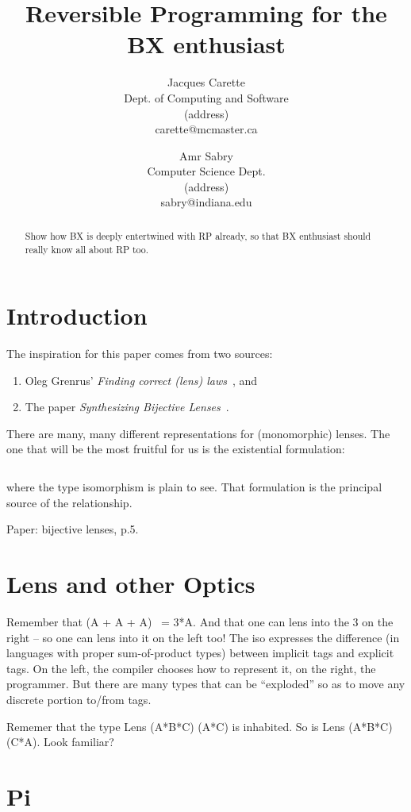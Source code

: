 \documentclass[a4paper]{article}
\title{Reversible Programming for the BX enthusiast}
\author{
Jacques Carette\\ Dept. of Computing and Software\\
		(address) \\ carette@mcmaster.ca
\and
Amr Sabry \\ Computer Science Dept.\\
		(address) \\ sabry@indiana.edu
}
\begin{document}
\maketitle

\begin{abstract}
Show how BX is deeply entertwined with RP already,
so that BX enthusiast should really know all about RP too.
\end{abstract}
\vskip 32pt


\section{Introduction}

The inspiration for this paper comes from two sources:
\begin{enumerate}
  \item Oleg Grenrus' \textit{Finding correct (lens) laws}~\cite{oleg-blog}, 
    and
  \item The paper \textit{Synthesizing Bijective Lenses}~\cite{Miltner2018}.
\end{enumerate}

There are many, many different representations for (monomorphic)
lenses. The one that will be the most fruitful for us is the
existential formulation:
\begin{verbatim}
\end{verbatim}
where the type isomorphism is plain to see. That formulation is the
principal source of the relationship.

Paper: bijective lenses, p.5.

\section{Lens and other Optics}

Remember that (A + A + A) ~= 3*A. And that one can lens into the 3
on the right -- so one can lens into it on the left too!
The iso expresses the difference (in languages with proper sum-of-product
types) between implicit tags and explicit tags. On the left, the compiler
chooses how to represent it, on the right, the programmer. But there are
many types that can be ``exploded'' so as to move any discrete portion
to/from tags.

Rememer that the type Lens (A*B*C) (A*C) is inhabited. So is
Lens (A*B*C) (C*A).  Look familiar?

\section{Pi}
\end{document}
